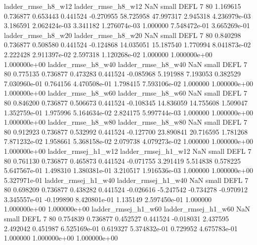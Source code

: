       ladder_rmse_h8_w12       ladder_rmse_h8_w12                   NaN      small     DEFL                 7 80 1.169615       0.736877 0.653443       0.441524   -0.270955     58.725958     47.997317     2.945318   4.236979e-03  3.186591 2.062424e-03     3.341182   1.276074e-03            1.000000    7.548472e-01        3.665269e-01
      ladder_rmse_h8_w20       ladder_rmse_h8_w20                   NaN      small     DEFL                 7 80 0.840298       0.736877 0.508580       0.441524   -0.124868     14.035051     15.187540     1.770994   8.041873e-02  2.222428 2.911397e-02     2.597318   1.120268e-02            1.000000    1.000000e+00        1.000000e+00
      ladder_rmse_h8_w40       ladder_rmse_h8_w40                   NaN      small     DEFL                 7 80 0.775135       0.736877 0.473283       0.441524   -0.085968      5.191988      7.193053     0.382529   7.030960e-01  0.764156 4.470508e-01     1.798415   7.593106e-02            1.000000    1.000000e+00        1.000000e+00
      ladder_rmse_h8_w60       ladder_rmse_h8_w60                   NaN      small     DEFL                 7 80 0.846200       0.736877 0.506673       0.441524   -0.108345     14.836059     14.755608     1.509047   1.352759e-01  1.975996 5.164634e-02     2.824175   5.997744e-03            1.000000    1.000000e+00        1.000000e+00
      ladder_rmse_h8_w80       ladder_rmse_h8_w80                   NaN      small     DEFL                 7 80 0.912923       0.736877 0.532992       0.441524   -0.127700     23.890841     20.716595     1.781268   7.871232e-02  1.958661 5.368158e-02     2.079738   4.079273e-02            1.000000    1.000000e+00        1.000000e+00
     ladder_rmsej_h1_w12      ladder_rmsej_h1_w12                   NaN      small     DEFL                 7 80 0.761130       0.736877 0.465873       0.441524   -0.071755      3.291419      5.514838     0.578225   5.647567e-01  1.498310 1.380381e-01     3.210517   1.916536e-03            1.000000    1.000000e+00        5.327971e-01
     ladder_rmsej_h1_w40      ladder_rmsej_h1_w40                   NaN      small     DEFL                 7 80 0.698209       0.736877 0.438282       0.441524   -0.026616     -5.247542     -0.734278    -0.970912   3.345557e-01 -0.199890 8.420801e-01     1.135149   2.597450e-01            1.000000    1.000000e+00        1.000000e+00
     ladder_rmsej_h1_w60      ladder_rmsej_h1_w60                   NaN      small     DEFL                 7 80 0.754839       0.736877 0.452527       0.441524   -0.018031      2.437595      2.492042     0.451987   6.525169e-01  0.619327 5.374832e-01     0.729952   4.675783e-01            1.000000    1.000000e+00        1.000000e+00

